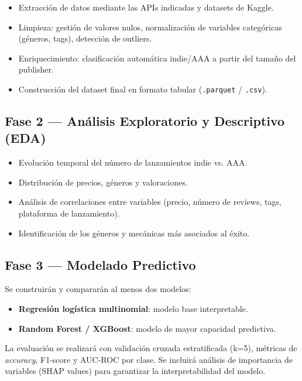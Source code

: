 \documentclass[12pt, a4paper]{article}
\begin{document}
\begin{itemize}
  \item Extracci\'on de datos mediante las APIs indicadas y datasets de Kaggle.
  \item Limpieza: gesti\'on de valores nulos, normalizaci\'on de variables categ\'oricas (g\'eneros, tags), detecci\'on de outliers.
  \item Enriquecimiento: clasificaci\'on autom\'atica indie/AAA a partir del tama\~no del publisher.
  \item Construcci\'on del dataset final en formato tabular (\texttt{.parquet} / \texttt{.csv}).
\end{itemize}

\subsection{Fase 2 --- An\'alisis Exploratorio y Descriptivo (EDA)}

\begin{itemize}
  \item Evoluci\'on temporal del n\'umero de lanzamientos indie vs. AAA.
  \item Distribuci\'on de precios, g\'eneros y valoraciones.
  \item An\'alisis de correlaciones entre variables (precio, n\'umero de reviews, tags, plataforma de lanzamiento).
  \item Identificaci\'on de los g\'eneros y mec\'anicas m\'as asociados al \'exito.
\end{itemize}

\subsection{Fase 3 --- Modelado Predictivo}

Se construir\'an y comparar\'an al menos dos modelos:

\begin{itemize}
  \item \textbf{Regresi\'on log\'istica multinomial}: modelo base interpretable.
  \item \textbf{Random Forest / XGBoost}: modelo de mayor capacidad predictiva.
\end{itemize}

La evaluaci\'on se realizar\'a con validaci\'on cruzada estratificada (k=5), m\'etricas de \textit{accuracy}, F1-score y AUC-ROC por clase. Se incluir\'a an\'alisis de importancia de variables (SHAP values) para garantizar la interpretabilidad del modelo.
\end{document}
